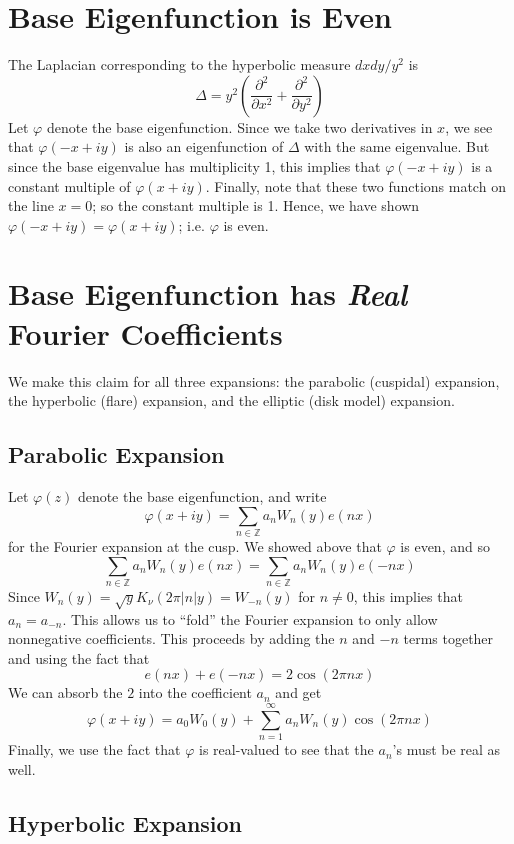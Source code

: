 \documentclass[]{article}
\begin{document}
\section*{Base Eigenfunction is Even}

The Laplacian corresponding to the hyperbolic measure $dxdy/y^2$ is
$$
\Delta = y^2\left( \frac{\partial^2}{\partial x^2} + \frac{\partial^2}{\partial y^2} \right)
$$
Let $\varphi$ denote the base eigenfunction.
Since we take two derivatives in $x$, we see that $\varphi(-x + iy)$ is also an eigenfunction of $\Delta$ with the same eigenvalue.
But since the base eigenvalue has multiplicity 1, this implies that $\varphi(-x + iy)$ is a constant multiple of $\varphi(x + iy)$.
Finally, note that these two functions match on the line $x = 0$; so the constant multiple is 1.
Hence, we have shown $\varphi(-x + iy) = \varphi(x + iy)$; i.e. $\varphi$ is even.

\section*{Base Eigenfunction has \textit{Real} Fourier Coefficients}

We make this claim for all three expansions: the parabolic (cuspidal) expansion, the hyperbolic (flare) expansion, and the elliptic (disk model) expansion.

\subsection*{Parabolic Expansion}

Let $\varphi(z)$ denote the base eigenfunction, and write
$$
\varphi(x + iy) = \sum_{n \in \mathbb{Z}}a_nW_n(y)e(nx)
$$
for the Fourier expansion at the cusp.
We showed above that $\varphi$ is even, and so
$$
\sum_{n \in \mathbb{Z}}a_nW_n(y)e(nx) = \sum_{n \in \mathbb{Z}}a_nW_n(y)e(-nx)
$$
Since $W_n(y) = \sqrt{y}K_\nu(2\pi|n|y) = W_{-n}(y)$ for $n \neq 0$, this implies that $a_n = a_{-n}$.
This allows us to ``fold'' the Fourier expansion to only allow nonnegative coefficients.
This proceeds by adding the $n$ and $-n$ terms together and using the fact that
$$
e(nx) + e(-nx) = 2\cos(2\pi nx)
$$
We can absorb the $2$ into the coefficient $a_n$ and get
$$
\varphi(x + iy) = a_0W_0(y) + \sum_{n = 1}^{\infty}a_nW_n(y)\cos(2\pi nx)
$$
Finally, we use the fact that $\varphi$ is real-valued to see that the $a_n$'s must be real as well.

\subsection*{Hyperbolic Expansion}
\end{document}
